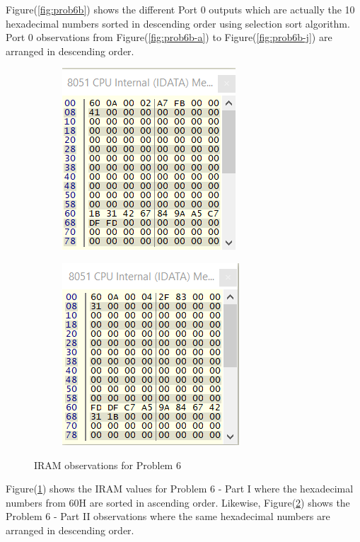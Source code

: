 \documentclass{lab_sheet}
\begin{document}
Figure(\ref{fig:prob6b}) shows the different Port 0 outputs which are actually the 10 hexadecimal numbers sorted in descending order using selection sort algorithm. Port 0 observations from Figure(\ref{fig:prob6b-a}) to Figure(\ref{fig:prob6b-j}) are arranged in descending order.
\begin{figure}[H]
\begin{subfigure}{.5\textwidth}
  \centering
  \includegraphics[frame,width=.8\linewidth]{../Figures/1_6_k.png}  
    \caption{}
  \label{fig:prob6-asc}
\end{subfigure}
\begin{subfigure}{.5\textwidth}
  \centering
  \includegraphics[frame,width=.8\linewidth]{../Figures/1_6_l.png}  
    \caption{}
  \label{fig:prob6-dec}
\end{subfigure}
\caption{IRAM observations for Problem 6}
\label{fig:prob6-IRAM}
\end{figure}
Figure(\ref{fig:prob6-asc}) shows the IRAM values for Problem 6 - Part I where the hexadecimal numbers from 60H are sorted in ascending order. Likewise, Figure(\ref{fig:prob6-dec}) shows the Problem 6 - Part II observations where the same hexadecimal numbers are arranged in descending order.
\end{document}

